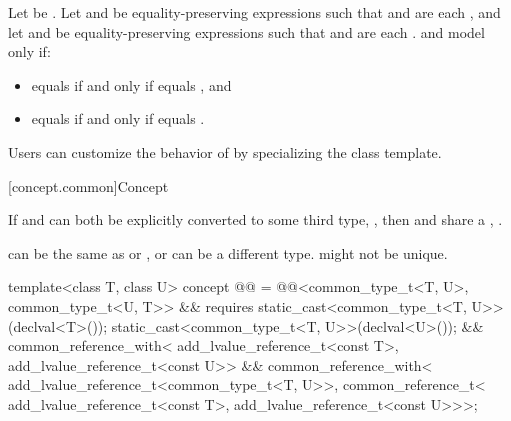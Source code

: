 \begin{itemdescr}
\pnum
Let  be .
Let  and  be equality-preserving
expressions such that
 and  are each , and
let  and  be equality-preserving expressions such that
 and  are each .
 and  model 
only if:
\begin{itemize}
\item {} equals  if and only if
   equals , and
\item {} equals  if and only if
   equals .
\end{itemize}

\pnum
\begin{note}
Users can customize the behavior of  by specializing
the  class template.
\end{note}
\end{itemdescr}

[concept.common]{Concept }

\pnum
If  and  can both be explicitly converted to some third type,
, then  and  share a ,
.
\begin{note}
 can be the same as  or , or can be a
different type.  might not be unique.
\end{note}

\begin{itemdecl}
template<class T, class U>
  concept @@ =
    @@<common_type_t<T, U>, common_type_t<U, T>> &&
    requires {
      static_cast<common_type_t<T, U>>(declval<T>());
      static_cast<common_type_t<T, U>>(declval<U>());
    } &&
    common_reference_with<
      add_lvalue_reference_t<const T>,
      add_lvalue_reference_t<const U>> &&
    common_reference_with<
      add_lvalue_reference_t<common_type_t<T, U>>,
      common_reference_t<
        add_lvalue_reference_t<const T>,
        add_lvalue_reference_t<const U>>>;
\end{itemdecl}

